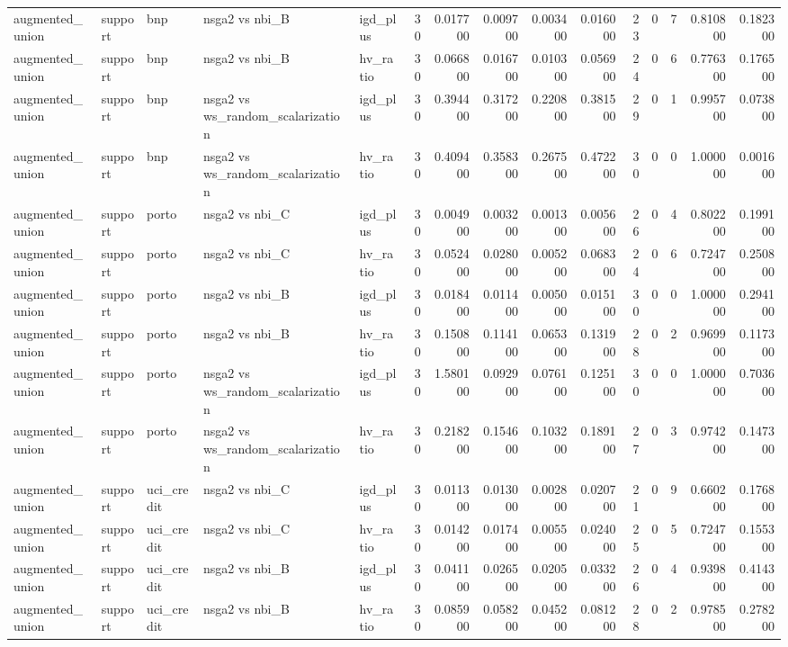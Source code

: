 \begin{landscape}
\begin{longtable}{lllllrrrrrrrrrr}
augmented\_union & support & bnp & nsga2 vs nbi\_B & igd\_plus & 30 & 0.017700 & 0.009700 & 0.003400 & 0.016000 & 23 & 0 & 7 & 0.810800 & 0.182300 \\
augmented\_union & support & bnp & nsga2 vs nbi\_B & hv\_ratio & 30 & 0.066800 & 0.016700 & 0.010300 & 0.056900 & 24 & 0 & 6 & 0.776300 & 0.176500 \\
augmented\_union & support & bnp & nsga2 vs ws\_random\_scalarization & igd\_plus & 30 & 0.394400 & 0.317200 & 0.220800 & 0.381500 & 29 & 0 & 1 & 0.995700 & 0.073800 \\
augmented\_union & support & bnp & nsga2 vs ws\_random\_scalarization & hv\_ratio & 30 & 0.409400 & 0.358300 & 0.267500 & 0.472200 & 30 & 0 & 0 & 1.000000 & 0.001600 \\
augmented\_union & support & porto & nsga2 vs nbi\_C & igd\_plus & 30 & 0.004900 & 0.003200 & 0.001300 & 0.005600 & 26 & 0 & 4 & 0.802200 & 0.199100 \\
augmented\_union & support & porto & nsga2 vs nbi\_C & hv\_ratio & 30 & 0.052400 & 0.028000 & 0.005200 & 0.068300 & 24 & 0 & 6 & 0.724700 & 0.250800 \\
augmented\_union & support & porto & nsga2 vs nbi\_B & igd\_plus & 30 & 0.018400 & 0.011400 & 0.005000 & 0.015100 & 30 & 0 & 0 & 1.000000 & 0.294100 \\
augmented\_union & support & porto & nsga2 vs nbi\_B & hv\_ratio & 30 & 0.150800 & 0.114100 & 0.065300 & 0.131900 & 28 & 0 & 2 & 0.969900 & 0.117300 \\
augmented\_union & support & porto & nsga2 vs ws\_random\_scalarization & igd\_plus & 30 & 1.580100 & 0.092900 & 0.076100 & 0.125100 & 30 & 0 & 0 & 1.000000 & 0.703600 \\
augmented\_union & support & porto & nsga2 vs ws\_random\_scalarization & hv\_ratio & 30 & 0.218200 & 0.154600 & 0.103200 & 0.189100 & 27 & 0 & 3 & 0.974200 & 0.147300 \\
augmented\_union & support & uci\_credit & nsga2 vs nbi\_C & igd\_plus & 30 & 0.011300 & 0.013000 & 0.002800 & 0.020700 & 21 & 0 & 9 & 0.660200 & 0.176800 \\
augmented\_union & support & uci\_credit & nsga2 vs nbi\_C & hv\_ratio & 30 & 0.014200 & 0.017400 & 0.005500 & 0.024000 & 25 & 0 & 5 & 0.724700 & 0.155300 \\
augmented\_union & support & uci\_credit & nsga2 vs nbi\_B & igd\_plus & 30 & 0.041100 & 0.026500 & 0.020500 & 0.033200 & 26 & 0 & 4 & 0.939800 & 0.414300 \\
augmented\_union & support & uci\_credit & nsga2 vs nbi\_B & hv\_ratio & 30 & 0.085900 & 0.058200 & 0.045200 & 0.081200 & 28 & 0 & 2 & 0.978500 & 0.278200 \\

\end{longtable}
\end{landscape}
